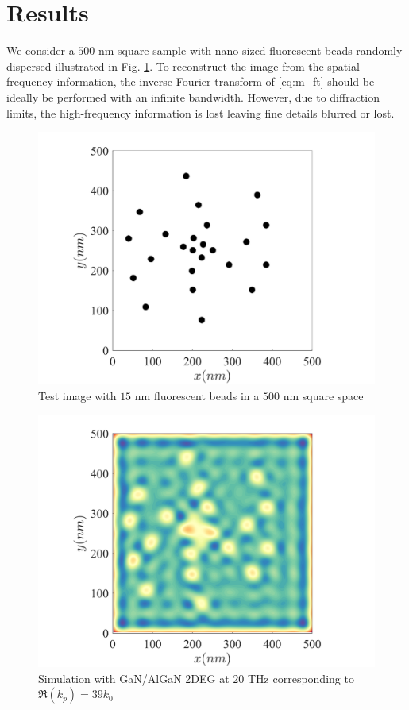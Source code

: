 \documentclass[11pt]{article}
\begin{document}
\section{Results}
%
We consider a $500$ nm square sample with nano-sized fluorescent beads randomly dispersed illustrated in Fig. \ref{fig:test}. To reconstruct the image from the spatial frequency information, the inverse Fourier transform of \eqref{eq:m_ft} should be ideally be performed with an infinite bandwidth. However, due to diffraction limits, the high-frequency information is lost leaving fine details blurred or lost.
%
\begin{figure}[h!]
  \centering
  \includegraphics[scale=1]{test.png}
  \caption{Test image with $15$ nm fluorescent beads in a $500$ nm square space}
  \label{fig:test}
\end{figure}

\begin{figure}[h!]
  \centering
  \includegraphics[scale=1]{free_space_sim.png}
  \caption{Simulation with GaN/AlGaN 2DEG at $20$ THz corresponding to $\Re(k_p) = 39 k_0$}
  \label{fig:sim_low}
\end{figure}
\end{document}
